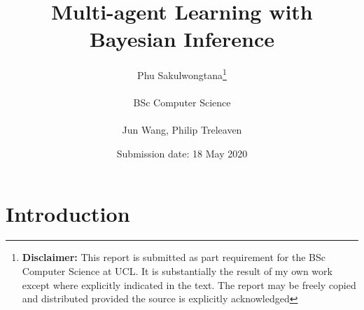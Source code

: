 \documentclass{report}
\title{{{\Huge Multi-agent Learning with Bayesian Inference}}\\
}
\date{Submission date: 18 May 2020}
\author{Phu Sakulwongtana\thanks{
{\bf Disclaimer:}
This report is submitted as part requirement for the BSc Computer Science at UCL. It is
substantially the result of my own work except where explicitly indicated in the text.
The report may be freely copied and distributed provided the source is explicitly acknowledged
}
\\ \\
BSc Computer Science\\ \\
Jun Wang, Philip Treleaven}
\makeatletter
\newcommand{\correctquote}[1]{``#1''}
\newenvironment{outline} {\renewcommand\abstractname{}\begin{abstract}} {\end{abstract}}
\renewenvironment{abstract}{%
    \if@twocolumn
      \section*{\abstractname}%
    \else %
      \begin{center}%
        {\bfseries \Large\abstractname\vspace{\z@}}%
      \end{center}%
      \quotation
    \fi}
    {\if@twocolumn\else\endquotation\fi}
\makeatother
\begin{document}
 
\onehalfspacing
\maketitle

\begin{abstract}

\end{abstract}



\setcounter{tocdepth}{1}
\tableofcontents

% 


\setcounter{page}{1}

\chapter{Introduction}

\end{document}
